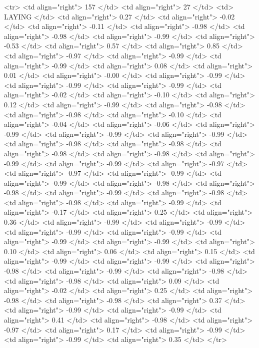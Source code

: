   <tr> <td align="right"> 157 </td> <td align="right">  27 </td> <td> LAYING </td> <td align="right"> 0.27 </td> <td align="right"> -0.02 </td> <td align="right"> -0.11 </td> <td align="right"> -0.98 </td> <td align="right"> -0.98 </td> <td align="right"> -0.99 </td> <td align="right"> -0.53 </td> <td align="right"> 0.57 </td> <td align="right"> 0.85 </td> <td align="right"> -0.97 </td> <td align="right"> -0.99 </td> <td align="right"> -0.99 </td> <td align="right"> 0.08 </td> <td align="right"> 0.01 </td> <td align="right"> -0.00 </td> <td align="right"> -0.99 </td> <td align="right"> -0.99 </td> <td align="right"> -0.99 </td> <td align="right"> -0.02 </td> <td align="right"> -0.10 </td> <td align="right"> 0.12 </td> <td align="right"> -0.99 </td> <td align="right"> -0.98 </td> <td align="right"> -0.98 </td> <td align="right"> -0.10 </td> <td align="right"> -0.04 </td> <td align="right"> -0.06 </td> <td align="right"> -0.99 </td> <td align="right"> -0.99 </td> <td align="right"> -0.99 </td> <td align="right"> -0.98 </td> <td align="right"> -0.98 </td> <td align="right"> -0.98 </td> <td align="right"> -0.98 </td> <td align="right"> -0.99 </td> <td align="right"> -0.99 </td> <td align="right"> -0.97 </td> <td align="right"> -0.97 </td> <td align="right"> -0.99 </td> <td align="right"> -0.99 </td> <td align="right"> -0.98 </td> <td align="right"> -0.98 </td> <td align="right"> -0.99 </td> <td align="right"> -0.98 </td> <td align="right"> -0.98 </td> <td align="right"> -0.99 </td> <td align="right"> -0.17 </td> <td align="right"> 0.25 </td> <td align="right"> 0.36 </td> <td align="right"> -0.99 </td> <td align="right"> -0.99 </td> <td align="right"> -0.99 </td> <td align="right"> -0.99 </td> <td align="right"> -0.99 </td> <td align="right"> -0.99 </td> <td align="right"> 0.10 </td> <td align="right"> 0.06 </td> <td align="right"> 0.15 </td> <td align="right"> -0.99 </td> <td align="right"> -0.99 </td> <td align="right"> -0.98 </td> <td align="right"> -0.99 </td> <td align="right"> -0.98 </td> <td align="right"> -0.98 </td> <td align="right"> 0.09 </td> <td align="right"> -0.02 </td> <td align="right"> 0.25 </td> <td align="right"> -0.98 </td> <td align="right"> -0.98 </td> <td align="right"> 0.37 </td> <td align="right"> -0.99 </td> <td align="right"> -0.99 </td> <td align="right"> 0.41 </td> <td align="right"> -0.98 </td> <td align="right"> -0.97 </td> <td align="right"> 0.17 </td> <td align="right"> -0.99 </td> <td align="right"> -0.99 </td> <td align="right"> 0.35 </td> </tr>
